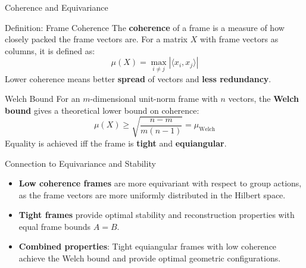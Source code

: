 \documentclass[9pt,dvipsnames]{beamer}
\begin{document}
\begin{frame}{Coherence and Equivariance}

	\begin{block}{Definition: Frame Coherence}
		The \textbf{coherence} of a frame is a measure of how closely packed the frame vectors are. For a matrix $X$ with frame vectors as columns, it is defined as:
		\begin{equation*}
			\mu(X) = \max_{i \neq j} |\langle x_i, x_j \rangle|
		\end{equation*}
		Lower coherence means better \textbf{spread} of vectors and \textbf{less redundancy}.
	\end{block}

	\begin{block}{Welch Bound}
		For an $m$-dimensional unit-norm frame with $n$ vectors, the \textbf{Welch bound} gives a theoretical lower bound on coherence:
		\begin{equation*}
			\mu(X) \geq \sqrt{\frac{n - m}{m(n - 1)}} = \mu_{\text{Welch}}
		\end{equation*}
		Equality is achieved iff the frame is \textbf{tight} and \textbf{equiangular}.
	\end{block}

	\begin{block}{Connection to Equivariance and Stability}
		\begin{itemize}
			\item \textbf{Low coherence frames} are more equivariant with respect to group actions, as the frame vectors are more uniformly distributed in the Hilbert space.
			\item \textbf{Tight frames} provide optimal stability and reconstruction properties with equal frame bounds $A = B$.
			\item \textbf{Combined properties}: Tight equiangular frames with low coherence achieve the Welch bound and provide optimal geometric configurations.
		\end{itemize}
	\end{block}

\end{frame}
\end{document}
